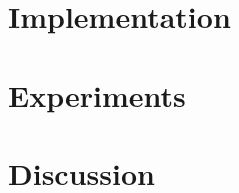 \documentclass[journal]{vgtc}                %
\theoremstyle{definition}
\begin{document}
\section{Implementation}
\label{sec:implementation}


\section{Experiments}
\label{sec:experiments}


\section{Discussion}
\label{sec:discussion}





\end{document}
